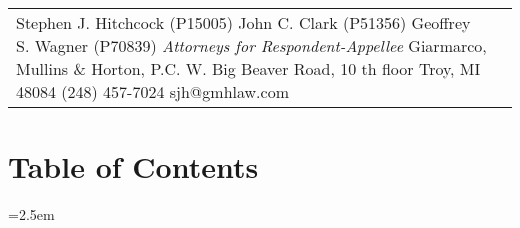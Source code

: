 \documentclass[12pt,\documentclassflag]{michiganCourtOfAppealsBrief}
\begin{document}
\begin{centering}
\begin{tabular}{p{} p{}}
{  Stephen J. Hitchcock (P15005)\newline
  John C. Clark (P51356) \newline
  Geoffrey S. Wagner (P70839)\newline
  \emph{Attorneys for Respondent-Appellee}\newline
Giarmarco, Mullins \& Horton, P.C.\newline
101 W. Big Beaver Road, 10 th floor\newline
Troy, MI 48084\newline
(248) 457-7024\newline
sjh@gmhlaw.com\newline
~}
\end{tabular}
\makeandletter
\par\vspace{\baselineskip}\vspace{\baselineskip}\vspace{\baselineskip}



\end{centering}

\pagestyle{romanparen}


\newpage 

\section*{Table of Contents}

\tableofcontents


\newpage
\tableofauthorities


\parindent=2.5em
\doublespacing



\end{document}
